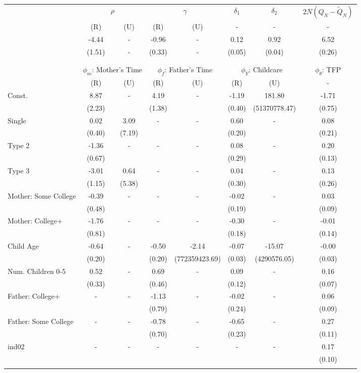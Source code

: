 \begin{tabular}{lccccccc}\toprule
 & \multicolumn{2}{c}{$\rho$} & \multicolumn{2}{c}{$\gamma$} & {$\delta_{1}$} & {$\delta_{2}$} & $2N(Q_{N} - \tilde{Q}_{N})$ \\
 & (R) & (U) & (R) & (U) & - & - & - \\\cmidrule(r){2-3}\cmidrule(r){4-5}\cmidrule(r){6-6}\cmidrule(r){7-7}\cmidrule(r){8-8}
&-4.44& - &-0.96& - &0.12&0.92&6.52\\
&(1.51)& - &(0.33)& - &(0.05)&(0.04)&(0.26)\\
\\
&&&&&&&\\
 & \multicolumn{2}{c}{$\phi_{m}$: Mother's Time} & \multicolumn{2}{c}{$\phi_{f}$: Father's Time} & \multicolumn{2}{c}{$\phi_{Y}$: Childcare} &{$\phi_{\theta}$: TFP} \\
 & (R) & (U) & (R) & (U) & (R) & (U) & -  \\\cmidrule(r){2-3}\cmidrule(r){4-5}\cmidrule(r){6-7}\cmidrule(r){8-8}
Const.&8.87& -&4.19& -&-1.19&181.80&-1.71\\
&(2.23)&&(1.38)&&(0.40)&(51370778.47)&(0.75)\\
Single&0.02&3.09& - & -&0.60& -&0.08\\
&(0.40)&(7.19) & &&(0.20)&&(0.21)\\
Type 2&-1.36& -& - & -&0.08& -&0.20\\
&(0.67)& & &&(0.29)&&(0.13)\\
Type 3&-3.01&0.64& - & -&0.04& -&0.13\\
&(1.15)&(5.38) & &&(0.30)&&(0.26)\\
Mother: Some College&-0.39& -& - & -&-0.02& -&0.03\\
&(0.48)& & &&(0.19)&&(0.09)\\
Mother: College+&-1.76& -& - & -&-0.30& -&-0.01\\
&(0.81)& & &&(0.18)&&(0.14)\\
Child Age&-0.64& -&-0.50&-2.14&-0.07&-15.07&-0.00\\
&(0.20)&&(0.20)&(772359423.69)&(0.03)&(4290576.05)&(0.03)\\
Num. Children 0-5&0.52& -&0.69& -&0.09& -&0.16\\
&(0.33)&&(0.46)&&(0.12)&&(0.07)\\
Father: College+& - & -&-1.13& -&-0.02& -&0.06\\
 & &&(0.79)&&(0.24)&&(0.09)\\
Father: Some College& - & -&-0.78& -&-0.65& -&0.27\\
 & &&(0.70)&&(0.23)&&(0.11)\\
ind02& - & -& - & -& - & -&0.17\\
 & & & & & &&(0.10)\\
\\
\bottomrule\end{tabular}